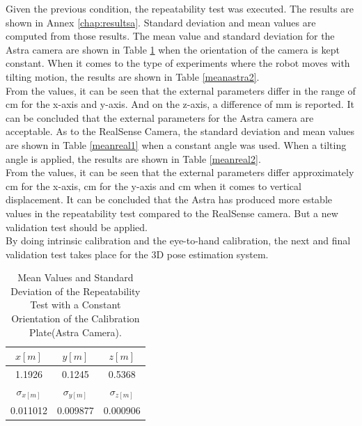 Given the previous condition, the repeatability test was executed. The results are shown in Annex \ref{chap:resultsa}. Standard deviation and mean values are computed from those results. The mean value and standard deviation for the Astra camera are shown in Table \ref{meanastra1} when the orientation of the camera is kept constant. When it comes to the type of experiments where the robot moves with tilting motion, the results are shown in Table \ref{meanastra2}.\\
From the values, it can be seen that the external parameters differ in the range of \unit[1]{cm} for the x-axis and y-axis. And on the z-axis, a difference of \unit[1] {mm} is reported. It can be concluded that the external parameters for the Astra camera are acceptable.
As to the RealSense Camera, the standard deviation and mean values are shown in Table \ref{meanreal1} when a constant angle was used. When a tilting angle is applied, the results are shown in Table \ref{meanreal2}.\\
From the values, it can be seen that the external parameters differ approximately \unit[1]{cm} for the x-axis, \unit[2] {cm} for the y-axis and \unit[1] {cm}  when it comes to vertical displacement.  It can be concluded that the Astra has produced more estable values in the repeatability test compared to the RealSense camera. But a new validation test should be applied. \\
By doing intrinsic calibration and the eye-to-hand calibration, the next and final validation test takes place for the 3D pose estimation system.


\begin{table}[ht]
\renewcommand{\arraystretch}{1.3}
\caption{Mean Values and Standard Deviation of the Repeatability Test with a Constant Orientation of the Calibration Plate(Astra Camera).}
\label{meanastra1}
\centering
\begin{tabular}{|c|c|c|}
\hline
$x[m]$ & $y[m]$ & $z[m]$ \\
\hline
1.1926 & 0.1245 & 0.5368 \\
\hline
$\sigma_{x[m]}$ & $\sigma_{y[m]}$ & $\sigma_{z[m]}$ \\
\hline
0.011012&	0.009877	&0.000906 \\
\hline
\end{tabular}
\end{table}



